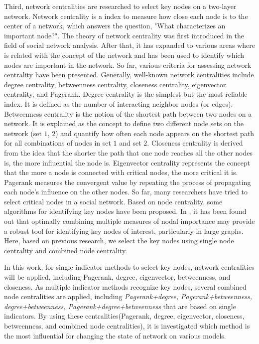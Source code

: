Third, network centralities are researched to select key nodes on a two-layer network. Network centrality is a index to measure how close each node is to the center of a network, which answers the question, "What characterizes an important node?". The theory of network centrality was first introduced in the field of social network analysis\parencite{freeman1979}. After that, it has expanded to various areas where is related with the concept of the network and has been used to identify which nodes are important in the network. So far, various criteria for assessing network centrality have been presented. Generally, well-known network centralities include degree centrality, betweenness centrality, closeness centrality, eigenvector centrality, and Pagerank\parencite{koschutzki2008, francisco2018, bianconi2018}. Degree centrality is the simplest but the most reliable index. It is defined as the number of interacting neighbor nodes (or edges).  Betweenness centrality is the notion of the shortest path between two nodes on a network. It is explained as the concept to define two different node sets on the network (set $1$, $2$) and quantify how often each node appears on the shortest path for all combinations of nodes in set $1$ and set $2$. Closeness centrality is derived from the idea that the shorter the path that one node reaches all the other nodes is, the more influential the node is. Eigenvector centrality represents the concept that the more a node is connected with critical nodes, the more critical it is. Pagerank measures the convergent value by repeating the process of propagating each node's influence on the other nodes.
So far, many researchers have tried to select critical nodes in a social network\parencite{eom2015, white2003, mesgari2015, hwang1981, huang2014}. Based on node centrality, some algorithms for identifying key nodes have been proposed. In \parencite{mesgari2015, huang2014}, it has been found out that optimally combining multiple measures of nodal importance may provide a robust tool for identifying key nodes of interest, particularly in large graphs. Here, based on previous research, we select the key nodes using single node centrality and combined node centrality.

In this work, for single indicator methods to select key nodes, network centralities will be applied, including Pagerank, degree, eigenvector, betweenness, and closeness. As multiple indicator methods recognize key nodes, several combined node centralities are applied, including \textit{Pagerank+degree, Pagerank+betweenness, degree+betweenness, Pagerank+degree+betweenness} that are based on single indicators. By using these centralities(Pagerank, degree, eigenvector, closeness, betweenness, and combined node centralities), it is investigated which method is the most influential for changing the state of network on various models.\\  

